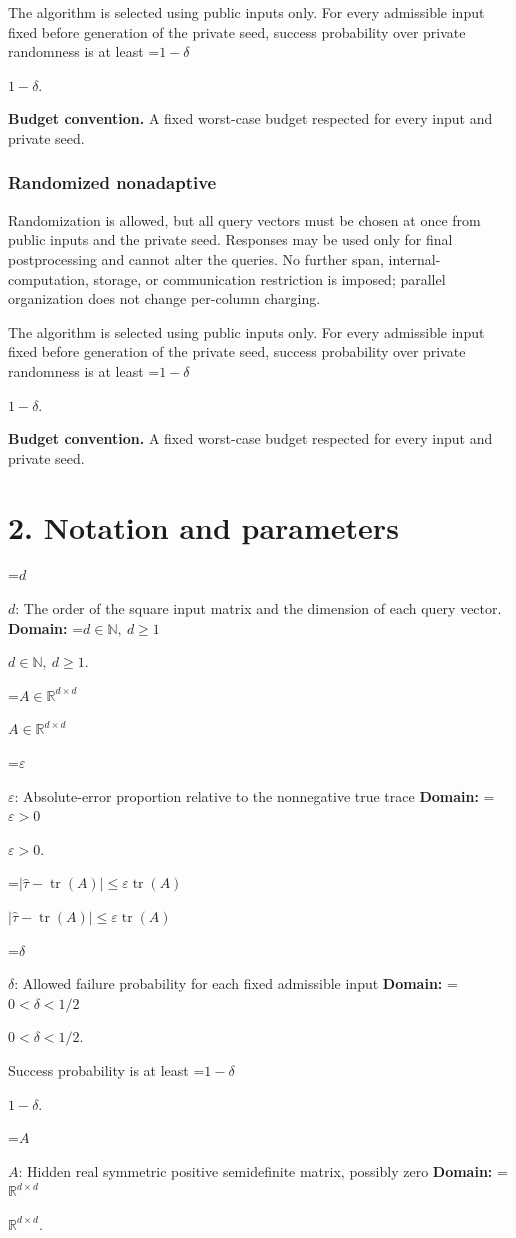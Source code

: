 \documentclass[10pt,a4paper]{article}
\newcommand{\AtlasMath}[1]{\par\begingroup\centering\setbox0=\hbox{$\displaystyle #1$}\ifdim\wd0>1.4\linewidth\typeout{ATLAS WIDE FORMULA: \the\wd0}\fi\ifdim\wd0>\linewidth\resizebox{\linewidth}{!}{\box0}\else\box0\fi\par\endgroup}
\newcommand{\AtlasInlineMath}[1]{\begingroup\setbox0=\hbox{$#1$}\ifdim\wd0>.4\linewidth\endgroup\AtlasMath{#1}\else\endgroup$#1$\fi}
\begin{document}
The algorithm is selected using public inputs only. For every admissible input fixed before generation of the private seed, success probability over private randomness is at least \AtlasInlineMath{1-\delta}.

\textbf{Budget convention.} A fixed worst-case budget respected for every input and private seed.

\subsubsection{Randomized nonadaptive}
Randomization is allowed, but all query vectors must be chosen at once from public inputs and the private seed. Responses may be used only for final postprocessing and cannot alter the queries. No further span, internal-computation, storage, or communication restriction is imposed; parallel organization does not change per-column charging.

The algorithm is selected using public inputs only. For every admissible input fixed before generation of the private seed, success probability over private randomness is at least \AtlasInlineMath{1-\delta}.

\textbf{Budget convention.} A fixed worst-case budget respected for every input and private seed.

\section{2. Notation and parameters}
\AtlasInlineMath{d}: The order of the square input matrix and the dimension of each query vector. \textbf{Domain:} \AtlasInlineMath{d\in\mathbb N,\ d\ge1}.

\AtlasInlineMath{A\in\mathbb R^{d\times d}}

\AtlasInlineMath{\varepsilon}: Absolute-error proportion relative to the nonnegative true trace \textbf{Domain:} \AtlasInlineMath{\varepsilon>0}.

\AtlasInlineMath{|\widehat\tau-\operatorname{tr}(A)|\le\varepsilon\operatorname{tr}(A)}

\AtlasInlineMath{\delta}: Allowed failure probability for each fixed admissible input \textbf{Domain:} \AtlasInlineMath{0<\delta<1/2}.

Success probability is at least \AtlasInlineMath{1-\delta}.

\AtlasInlineMath{A}: Hidden real symmetric positive semidefinite matrix, possibly zero \textbf{Domain:} \AtlasInlineMath{\mathbb R^{d\times d}}.
\end{document}

